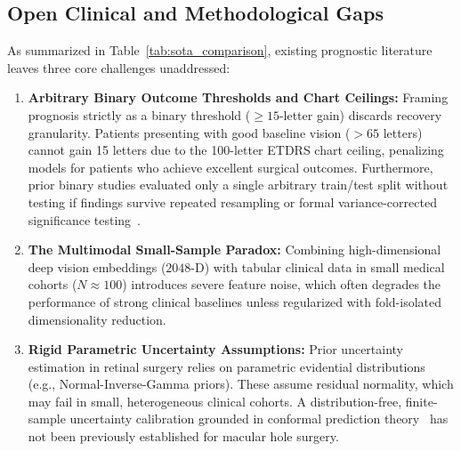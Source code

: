 \documentclass[preprint,12pt]{elsarticle}
\begin{document}
\subsection{Open Clinical and Methodological Gaps}
As summarized in Table~\ref{tab:sota_comparison}, existing prognostic literature leaves three core challenges unaddressed:
\begin{enumerate}
    \item \textbf{Arbitrary Binary Outcome Thresholds and Chart Ceilings:} Framing prognosis strictly as a binary threshold ($\ge 15$-letter gain) discards recovery granularity. Patients presenting with good baseline vision ($>65$ letters) cannot gain 15 letters due to the 100-letter ETDRS chart ceiling, penalizing models for patients who achieve excellent surgical outcomes. Furthermore, prior binary studies evaluated only a single arbitrary train/test split without testing if findings survive repeated resampling or formal variance-corrected significance testing~\cite{nadeau2003}.
    \item \textbf{The Multimodal Small-Sample Paradox:} Combining high-dimensional deep vision embeddings ($2048$-D) with tabular clinical data in small medical cohorts ($N \approx 100$) introduces severe feature noise, which often degrades the performance of strong clinical baselines unless regularized with fold-isolated dimensionality reduction.
    \item \textbf{Rigid Parametric Uncertainty Assumptions:} Prior uncertainty estimation in retinal surgery relies on parametric evidential distributions (e.g., Normal-Inverse-Gamma priors). These assume residual normality, which may fail in small, heterogeneous clinical cohorts. A distribution-free, finite-sample uncertainty calibration grounded in conformal prediction theory~\cite{vovk2005, angelopoulos2021} has not been previously established for macular hole surgery.
\end{enumerate}
\end{document}
